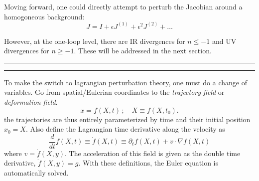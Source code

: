 Moving forward, one could directly attempt to perturb the Jacobian around a homogoneous background:
\begin{equation}
	J = I+\epsilon J^{(1)}+ \epsilon^2J^{(2)} + \dots
\end{equation}

However, at the one-loop level, there are IR divergences for $n\leq -1$ and UV divergences for $n\geq -1$. These will be addressed in the next section.






\hrule
\hrule

To make the switch to lagrangian perturbation theory, one must do a change of variables. Go from spatial/Eulerian coordinates to the \textit{trajectory field} or \emph{deformation field}.
\begin{equation}
	x = f(X,t)\,;\quad X\equiv f(X,t_0).
\end{equation}
the trajectories are thus entirely parameterized by time and their initial position $x_0=X$. Also define the Lagrangian time derivative along the velocity as
\begin{equation}
	\frac{d}{dt}f(X,t) \equiv \dot{f}(X,t) \equiv \partial_tf(X,t) + v \cdot \nabla f(X,t)
\end{equation}
where $v=\dot f (X,y)$. The acceleration of this field is given as the double time derivative, $\ddot{f}(X,y) = g$. With these definitions, the Euler equation is automatically solved. 

